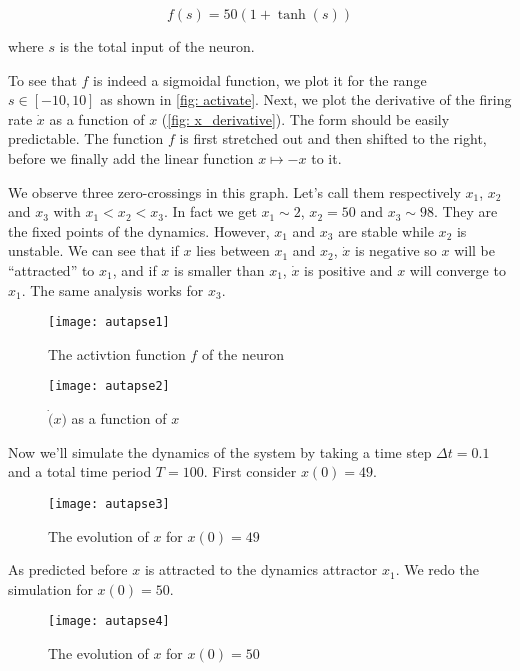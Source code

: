 \[f(s) = 50(1 + \tanh(s))\]

\noindent
where $s$ is the total input of the neuron.

To see that $f$ is indeed a sigmoidal function, we plot it for the range 
$s \in [-10, 10]$ as shown in \autoref{fig: activate}. Next, we plot the
derivative of the firing rate $\dot{x}$ as a function of $x$ 
(\autoref{fig: x_derivative}). The form should be easily predictable.
The function $f$ is first stretched out and then shifted to the right,
before we finally add the linear function $x \mapsto -x$ to it.

We observe three zero-crossings in this graph. Let's call them respectively
$x_1$, $x_2$ and $x_3$ with $x_1 < x_2 < x_3$. In fact we get $x_1 \sim 2$,
$x_2 = 50$ and $x_3 \sim 98$. They are the fixed points of the dynamics.
However, $x_1$ and $x_3$ are stable while $x_2$ is unstable.
We can see that if $x$ lies between $x_1$ and $x_2$, $\dot{x}$ is negative
so $x$ will be ``attracted'' to $x_1$, and if $x$ is smaller than $x_1$,
$\dot{x}$ is positive and $x$ will converge to $x_1$. The same analysis
works for $x_3$.

\newpage

\vspace{-1em}
\begin{figure}[H]
  \centering
  \texttt{[image: autapse1]}
  \caption{The activtion function $f$ of the neuron}
  \label{fig: activate}
\end{figure}

\vspace{-1em}
\begin{figure}[H]
  \centering
  \texttt{[image: autapse2]}
  \caption{$\dot(x)$ as a function of $x$}
  \label{fig: x_derivative}
\end{figure}

Now we'll simulate the dynamics of the system by taking a time step 
$\Delta t = 0.1$ and a total time period $T = 100$. First consider
$x(0) = 49$.

\vspace{-1em}
\begin{figure}[H]
  \centering
  \texttt{[image: autapse3]}
  \caption{The evolution of $x$ for $x(0) = 49$}
\end{figure}

\noindent
As predicted before $x$ is attracted to the dynamics attractor $x_1$.
We redo the simulation for $x(0) = 50$.

\vspace{-1em}
\begin{figure}[H]
  \centering
  \texttt{[image: autapse4]}
  \caption{The evolution of $x$ for $x(0) = 50$}
\end{figure}


